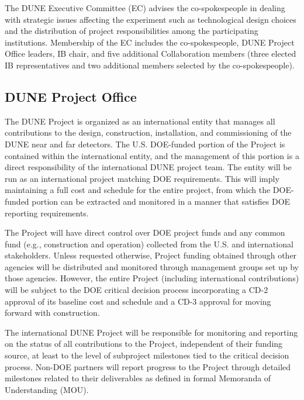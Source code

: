 The DUNE Executive Committee (EC) advises the co-spokespeople in dealing with strategic issues affecting the experiment such as technological design choices and the distribution of project responsibilities among the participating institutions.  Membership of the EC includes the co-spokespeople, DUNE Project Office leaders, IB chair, and five additional Collaboration members (three elected IB representatives and two additional %
members selected by the co-spokespeople).

\subsection{DUNE Project Office}

The DUNE Project is organized as an international entity that manages all contributions to the design, construction, installation, and commissioning of the DUNE near and far detectors.  The U.S. DOE-funded portion of the Project is contained within the international entity, and the management of this portion is a direct responsibility of the international DUNE project team.  The entity will be run as an international project matching DOE requirements. This will imply maintaining a full cost and schedule for the entire project, from which the DOE-funded portion can be extracted and monitored in a manner that satisfies DOE reporting requirements. 

The Project will have direct control over DOE project funds and any common fund (e.g., construction and operation) collected from the U.S. and international stakeholders.  Unless requested otherwise, Project funding obtained through other agencies will be distributed and monitored through management groups set up by those agencies.  However, the entire Project (including international contributions) will be subject to the DOE critical decision process incorporating a CD-2 approval of its baseline cost and schedule and a CD-3 approval for moving forward with construction.  

The international DUNE Project will be responsible for monitoring and reporting on the status of all contributions to the Project, independent of their funding source, at least to the level of subproject milestones tied to the critical decision process.  Non-DOE partners will report progress to the Project through detailed milestones related to their deliverables as defined in formal Memoranda of Understanding (MOU).     







